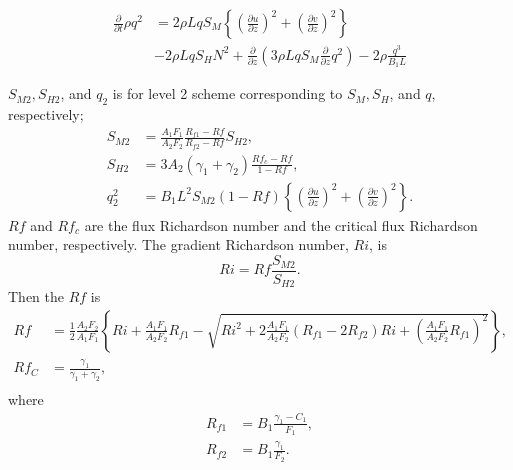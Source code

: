 \begin{align}
  \frac{\partial }{\partial t}\rho q^2
  &= 2\rho LqS_M\left\{\left(\frac{\partial u}{\partial z}\right)^2
                +\left(\frac{\partial v}{\partial z}\right)^2\right\} \nonumber\\
  &-2\rho LqS_HN^2
  +\frac{\partial}{\partial z}\left(3\rho LqS_M\frac{\partial}{\partial z}q^2\right)
  -2\rho\frac{q^3}{B_1L}
\end{align}



$S_{M2}, S_{H2}$, and $q_2$ is for level 2 scheme corresponding to $S_M, S_H$, and $q$, respectively;
\begin{align}
  S_{M2} &= \frac{A_1F_1}{A_2F_2}\frac{R_{f1}-Rf}{R_{f2}-Rf} S_{H2}, \\
  S_{H2} &= 3 A_2 (\gamma_1 + \gamma_2) \frac{Rf_c - Rf}{1-Rf}, \\
  q_2^2 &= B_1 L^2 S_{M2} (1-Rf) \left\{\left(\frac{\partial u}{\partial z}\right)^2+\left(\frac{\partial v}{\partial z}\right)^2\right\}.
\end{align}
$Rf$ and $Rf_c$ are the flux Richardson number and the critical flux Richardson number, respectively.
The gradient Richardson number, $Ri$, is
\begin{equation}
  Ri = Rf \frac{S_{M2}}{S_{H2}}.
\end{equation}
Then the $Rf$ is
\begin{align}
  Rf &= \frac{1}{2}\frac{A_2F_2}{A_1F_1}
  \left\{ Ri + \frac{A_1F_1}{A_2F_2}R_{f1}
        -\sqrt{Ri^2+2\frac{A_1F_1}{A_2F_2}(R_{f1}-2R_{f2})Ri+\left(\frac{A_1F_1}{A_2F_2}R_{f1}\right)^2} \right\}, \\
  Rf_C &= \frac{\gamma_1}{\gamma_1+\gamma_2}, \\
\end{align}
where
\begin{align}
  R_{f1} &= B_1\frac{\gamma_1-C_1}{F_1}, \\
  R_{f2} &= B_1\frac{\gamma_1}{F_2}.
\end{align}

